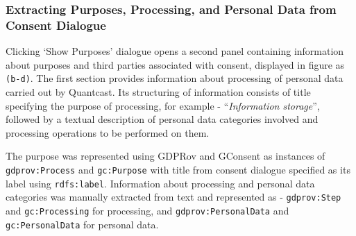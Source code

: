\subsubsection{Extracting Purposes, Processing, and Personal Data from Consent Dialogue}
Clicking `Show Purposes' dialogue opens a second panel containing information about purposes and third parties associated with consent, displayed in figure as \texttt{(b-d)}.
The first section provides information about processing of personal data carried out by Quantcast. Its structuring of information consists of title specifying the purpose of processing, for example - ``\textit{Information storage}'', followed by a textual description of personal data categories involved and processing operations to be performed on them.

The purpose was represented using GDPRov and GConsent as instances of \texttt{gdprov:Process} and \texttt{gc:Purpose} with title from consent dialogue specified as its label using \texttt{rdfs:label}. 
Information about processing and personal data categories was manually extracted from text and represented as - \texttt{gdprov:Step} and \texttt{gc:Processing} for processing, and \texttt{gdprov:PersonalData} and \texttt{gc:PersonalData} for personal data.

